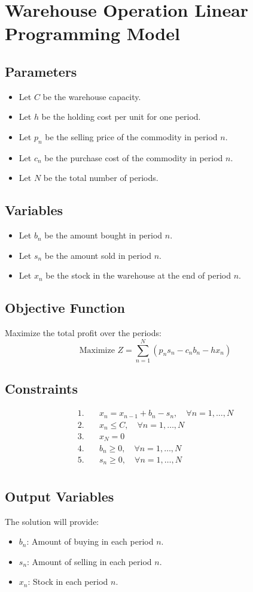 \documentclass{article}
\begin{document}
\section*{Warehouse Operation Linear Programming Model}

\subsection*{Parameters}
\begin{itemize}
    \item Let \( C \) be the warehouse capacity.
    \item Let \( h \) be the holding cost per unit for one period.
    \item Let \( p_n \) be the selling price of the commodity in period \( n \).
    \item Let \( c_n \) be the purchase cost of the commodity in period \( n \).
    \item Let \( N \) be the total number of periods.
\end{itemize}

\subsection*{Variables}
\begin{itemize}
    \item Let \( b_n \) be the amount bought in period \( n \).
    \item Let \( s_n \) be the amount sold in period \( n \).
    \item Let \( x_n \) be the stock in the warehouse at the end of period \( n \).
\end{itemize}

\subsection*{Objective Function}
Maximize the total profit over the periods:
\[
\text{Maximize } Z = \sum_{n=1}^{N} (p_n s_n - c_n b_n - h x_n)
\]

\subsection*{Constraints}
\begin{align*}
    1. & \quad x_n = x_{n-1} + b_n - s_n, \quad \forall n = 1, \ldots, N \\
    2. & \quad x_n \leq C, \quad \forall n = 1, \ldots, N \\
    3. & \quad x_N = 0 \\
    4. & \quad b_n \geq 0, \quad \forall n = 1, \ldots, N \\
    5. & \quad s_n \geq 0, \quad \forall n = 1, \ldots, N \\
\end{align*}

\subsection*{Output Variables}
The solution will provide:
\begin{itemize}
    \item \( b_n \): Amount of buying in each period \( n \).
    \item \( s_n \): Amount of selling in each period \( n \).
    \item \( x_n \): Stock in each period \( n \).
\end{itemize}
\end{document}
